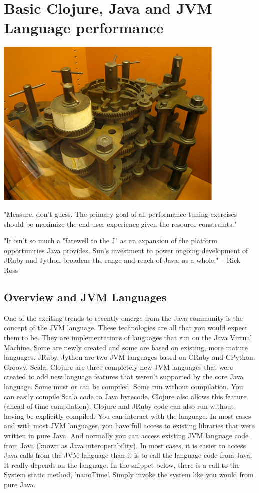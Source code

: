 \section{Basic Clojure, Java and JVM Language performance}

\includegraphics[width=110mm]{BabbageDifferenceEngine.eps}

"Measure, don't guess. The primary goal of all performance tuning exercises should be maximize the end user experience given the resource constraints."

"It isn't so much a "farewell to the J" as an expansion of the platform opportunities Java provides. Sun's investment to power ongoing development of JRuby and Jython broadens the range and reach of Java, as a whole." -- Rick Ross

\subsection{Overview and JVM Languages}

One of the exciting trends to recently emerge from the Java community is the concept of the JVM language. These technologies are all that you would expect them to be. They are implementations of languages that run on the Java Virtual Machine. Some are newly created and some are based on existing, more mature languages. JRuby, Jython are two JVM languages based on CRuby and CPython. Groovy, Scala, Clojure are three completely new JVM languages that were created to add new language features that weren't supported by the core Java language. Some must or can be compiled. Some run without compilation. You can easily compile Scala code to Java bytecode. Clojure also allows this feature (ahead of time compilation). Clojure and JRuby code can also run without having be explicitly compiled. You can interact with the language. In most cases and with most JVM languages, you have full access to existing libraries that were written in pure Java. And normally you can access existing JVM language code from Java (known as Java interoperability). In most cases, it is easier to access Java calls from the JVM language than it is to call the language code from Java. It really depends on the language. In the snippet below, there is a call to the System static method, 'nanoTime'. Simply invoke the system like you would from pure Java.

